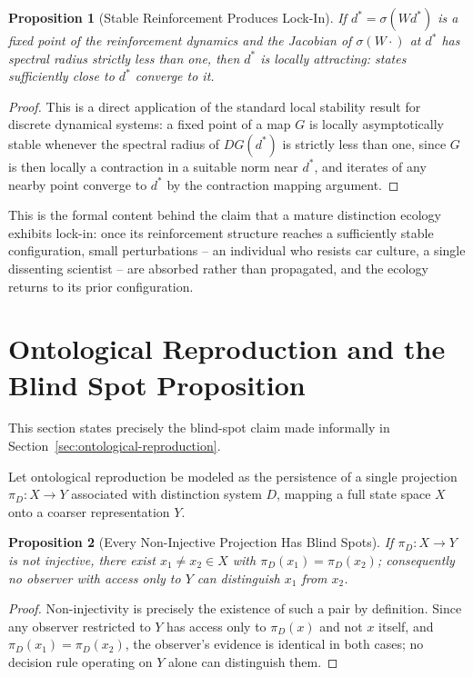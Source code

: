 \documentclass[11pt]{article}
\theoremstyle{plain}
\newtheorem{proposition}{Proposition}[section]
\begin{document}
\begin{proposition}[Stable Reinforcement Produces Lock-In]
If $d^\ast = \sigma(Wd^\ast)$ is a fixed point of the reinforcement dynamics and the Jacobian of $\sigma(W\cdot)$ at $d^\ast$ has spectral radius strictly less than one, then $d^\ast$ is locally attracting: states sufficiently close to $d^\ast$ converge to it.
\end{proposition}
\begin{proof}
This is a direct application of the standard local stability result for discrete dynamical systems: a fixed point of a map $G$ is locally asymptotically stable whenever the spectral radius of $DG(d^\ast)$ is strictly less than one, since $G$ is then locally a contraction in a suitable norm near $d^\ast$, and iterates of any nearby point converge to $d^\ast$ by the contraction mapping argument.
\end{proof}

\noindent This is the formal content behind the claim that a mature distinction ecology exhibits lock-in: once its reinforcement structure reaches a sufficiently stable configuration, small perturbations -- an individual who resists car culture, a single dissenting scientist -- are absorbed rather than propagated, and the ecology returns to its prior configuration.

\section{Ontological Reproduction and the Blind Spot Proposition}
\label{app:blind-spot}

\noindent This section states precisely the blind-spot claim made informally in Section~\ref{sec:ontological-reproduction}.

Let ontological reproduction be modeled as the persistence of a single projection $\pi_D: X \to Y$ associated with distinction system $D$, mapping a full state space $X$ onto a coarser representation $Y$.

\begin{proposition}[Every Non-Injective Projection Has Blind Spots]
If $\pi_D : X \to Y$ is not injective, there exist $x_1 \neq x_2 \in X$ with $\pi_D(x_1) = \pi_D(x_2)$; consequently no observer with access only to $Y$ can distinguish $x_1$ from $x_2$.
\end{proposition}
\begin{proof}
Non-injectivity is precisely the existence of such a pair by definition. Since any observer restricted to $Y$ has access only to $\pi_D(x)$ and not $x$ itself, and $\pi_D(x_1) = \pi_D(x_2)$, the observer's evidence is identical in both cases; no decision rule operating on $Y$ alone can distinguish them.
\end{proof}
\end{document}
